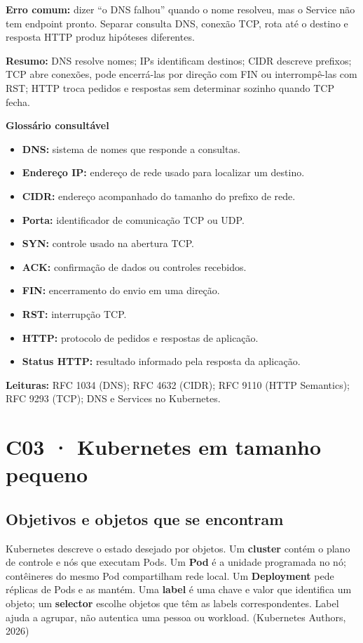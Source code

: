 \documentclass[12pt,openany,oneside,a4paper,chapter=TITLE,english,brazil]{abntex2}
\providecommand{\tightlist}{\setlength{\itemsep}{0pt}\setlength{\parskip}{0pt}}
\begin{document}
\textbf{Erro comum:} dizer ``o DNS falhou'' quando o nome resolveu, mas o Service não tem endpoint pronto. Separar consulta DNS, conexão TCP, rota até o destino e resposta HTTP produz hipóteses diferentes.

\textbf{Resumo:} DNS resolve nomes; IPs identificam destinos; CIDR descreve prefixos; TCP abre conexões, pode encerrá-las por direção com FIN ou interrompê-las com RST; HTTP troca pedidos e respostas sem determinar sozinho quando TCP fecha.

\textbf{Glossário consultável}

\begin{itemize}
\tightlist
\item
  \textbf{DNS:} sistema de nomes que responde a consultas.
\item
  \textbf{Endereço IP:} endereço de rede usado para localizar um destino.
\item
  \textbf{CIDR:} endereço acompanhado do tamanho do prefixo de rede.
\item
  \textbf{Porta:} identificador de comunicação TCP ou UDP.
\item
  \textbf{SYN:} controle usado na abertura TCP.
\item
  \textbf{ACK:} confirmação de dados ou controles recebidos.
\item
  \textbf{FIN:} encerramento do envio em uma direção.
\item
  \textbf{RST:} interrupção TCP.
\item
  \textbf{HTTP:} protocolo de pedidos e respostas de aplicação.
\item
  \textbf{Status HTTP:} resultado informado pela resposta da aplicação.
\end{itemize}

\textbf{Leituras:} RFC 1034 (DNS); RFC 4632 (CIDR); RFC 9110 (HTTP Semantics); RFC 9293 (TCP); DNS e Services no Kubernetes.

\chapter{C03 · Kubernetes em tamanho pequeno}\label{c03-kubernetes-em-tamanho-pequeno}

\section{Objetivos e objetos que se encontram}\label{objetivos-e-objetos-que-se-encontram}

Kubernetes descreve o estado desejado por objetos. Um \textbf{cluster} contém o plano de controle e nós que executam Pods. Um \textbf{Pod} é a unidade programada no nó; contêineres do mesmo Pod compartilham rede local. Um \textbf{Deployment} pede réplicas de Pods e as mantém. Uma \textbf{label} é uma chave e valor que identifica um objeto; um \textbf{selector} escolhe objetos que têm as labels correspondentes. Label ajuda a agrupar, não autentica uma pessoa ou workload. (Kubernetes Authors, 2026)
\end{document}

